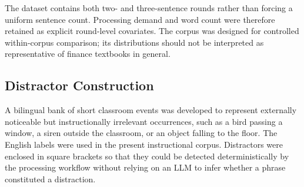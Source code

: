 \begin{table}[htbp]
\centering
\caption{Descriptive characteristics of the frozen instructional corpus and assessment dataset.}
\label{tab:dataset-characterisation}
\small
{}
\end{table}

The dataset contains both two- and three-sentence rounds rather than forcing a uniform sentence count. Processing demand and word count were therefore retained as explicit round-level covariates. The corpus was designed for controlled within-corpus comparison; its distributions should not be interpreted as representative of finance textbooks in general.

\subsection{Distractor Construction}
\label{subsec:distractor-construction}

A bilingual bank of short classroom events was developed to represent externally noticeable but instructionally irrelevant occurrences, such as a bird passing a window, a siren outside the classroom, or an object falling to the floor. The English labels were used in the present instructional corpus. Distractors were enclosed in square brackets so that they could be detected deterministically by the processing workflow without relying on an LLM to infer whether a phrase constituted a distraction.

